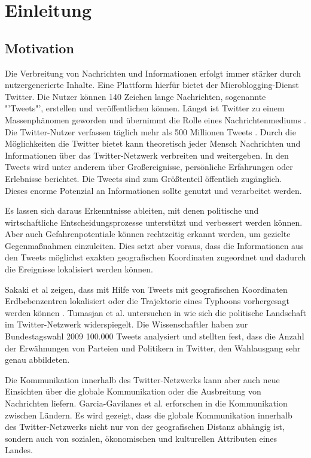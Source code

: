 \chapter{Einleitung}\label{chp:Einleitung}

	\section{Motivation}

		Die Verbreitung von Nachrichten und Informationen erfolgt immer stärker durch nutzergenerierte Inhalte.
		Eine Plattform hierfür bietet der Microblogging-Dienst Twitter. 
		Die Nutzer können 140 Zeichen lange Nachrichten, sogenannte "'Tweets"', erstellen und veröffentlichen können.
		Längst ist Twitter zu einem Massenphänomen geworden und übernimmt die Rolle eines Nachrichtenmediums \cite{Petrovic2013}.
		Die Twitter-Nutzer verfassen täglich mehr als 500 Millionen Tweets \cite{twitterinc2013}. 
		Durch die Möglichkeiten die Twitter bietet kann theoretisch jeder Mensch Nachrichten und Informationen über das Twitter-Netzwerk verbreiten und weitergeben. 
		In den Tweets wird unter anderem über Großereignisse, persönliche Erfahrungen oder Erlebnisse berichtet. 
		Die Tweets sind zum Größtenteil öffentlich zugänglich.
		Dieses enorme Potenzial an Informationen sollte genutzt und verarbeitet werden.
		
		Es lassen sich daraus Erkenntnisse ableiten, mit denen politische und wirtschaftliche Entscheidungsprozesse unterstützt und verbessert werden können. 
		Aber auch Gefahrenpotentiale können rechtzeitig erkannt werden, um gezielte Gegenmaßnahmen einzuleiten.
		Dies setzt aber voraus, dass die Informationen aus den Tweets möglichst exakten geografischen Koordinaten zugeordnet und dadurch die Ereignisse lokalisiert werden können.

		Sakaki et al zeigen, dass mit Hilfe von Tweets mit geografischen Koordinaten Erdbebenzentren lokalisiert oder die Trajektorie eines Typhoons vorhergesagt werden können \cite{Sakaki2010}.  
		Tumasjan et al. untersuchen in \cite{Tumasjan2011} wie sich die politische Landschaft im Twitter-Netzwerk widerspiegelt. 
		Die Wissenschaftler haben zur Bundestagswahl 2009 100.000 Tweets analysiert und stellten fest, dass die Anzahl der Erwähnungen von Parteien und Politikern in Twitter, den Wahlausgang sehr genau abbildeten.  
		
		Die Kommunikation innerhalb des Twitter-Netzwerks kann aber auch neue Einsichten über die globale Kommunikation oder die Ausbreitung von Nachrichten liefern.
		Garcia-Gavilanes et al. erforschen in \cite{Garcia-Gavilanes2014} die Kommunikation zwischen Ländern. 
		Es wird gezeigt, dass die globale Kommunikation innerhalb des Twitter-Netzwerks nicht nur von der geografischen Distanz abhängig ist, sondern auch von sozialen, ökonomischen und kulturellen Attributen eines Landes.   


